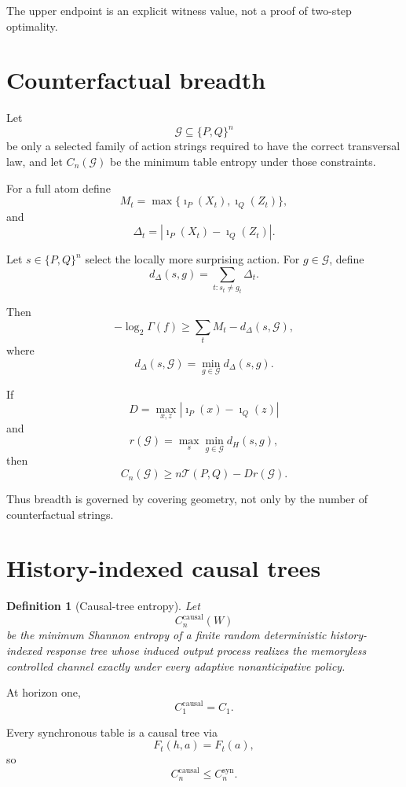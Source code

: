 \documentclass[11pt,a4paper]{article}
\newtheorem{definition}[theorem]{Definition}
\newcommand{\Csyn}{C^{\mathrm{syn}}}
\newcommand{\Ccausal}{C^{\mathrm{causal}}}
\newcommand{\cG}{\mathcal G}
\newcommand{\1}{\mathbf 1}
\begin{document}
The upper endpoint is an explicit witness value, not a proof of
two-step optimality.


\section{Counterfactual breadth}

Let
\[
\cG\subseteq\{P,Q\}^n
\]
be only a selected family of action strings required to have the correct
transversal law, and let \(C_n(\cG)\) be the minimum table entropy under
those constraints.

For a full atom define
\[
M_t
=
\max\{\imath_P(X_t),\imath_Q(Z_t)\},
\]
and
\[
\Delta_t
=
|\imath_P(X_t)-\imath_Q(Z_t)|.
\]

Let \(s\in\{P,Q\}^n\) select the locally more surprising action.
For \(g\in\cG\), define
\[
d_\Delta(s,g)
=
\sum_{t:s_t\ne g_t}\Delta_t.
\tag{11.1}
\]

Then
\[
-\log_2\Gamma(f)
\ge
\sum_tM_t-d_\Delta(s,\cG),
\tag{11.2}
\]
where
\[
d_\Delta(s,\cG)
=
\min_{g\in\cG}d_\Delta(s,g).
\]

If
\[
D
=
\max_{x,z}
|\imath_P(x)-\imath_Q(z)|
\tag{11.3}
\]
and
\[
r(\cG)
=
\max_s\min_{g\in\cG}d_H(s,g),
\tag{11.4}
\]
then
\[
\boxed{
C_n(\cG)
\ge
n\mathcal T(P,Q)-Dr(\cG).
}
\tag{11.5}
\]

Thus breadth is governed by covering geometry, not only by the number of
counterfactual strings.


\section{History-indexed causal trees}

\begin{definition}[Causal-tree entropy]
Let
\[
\Ccausal_n(W)
\]
be the minimum Shannon entropy of a finite random deterministic
history-indexed response tree whose induced output process realizes the
memoryless controlled channel exactly under every adaptive
nonanticipative policy.
\end{definition}

At horizon one,
\[
\Ccausal_1=C_1.
\tag{12.1}
\]

Every synchronous table is a causal tree via
\[
F_t(h,a)=F_t(a),
\]
so
\[
\boxed{
\Ccausal_n\le\Csyn_n.
}
\tag{12.2}
\]
\end{document}

